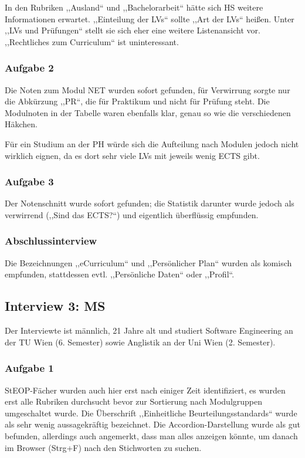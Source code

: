 \documentclass[a4paper,10pt]{scrartcl}
\begin{document}
In den Rubriken ,,Ausland`` und ,,Bachelorarbeit`` hätte sich HS weitere Informationen erwartet. ,,Einteilung der LVs`` sollte ,,Art der LVs`` heißen. Unter ,,LVs und Prüfungen`` stellt sie sich eher eine weitere Listenansicht vor. ,,Rechtliches zum Curriculum`` ist uninteressant.

\subsubsection*{Aufgabe 2}

Die Noten zum Modul NET wurden sofort gefunden, für Verwirrung sorgte nur die Abkürzung ,,PR``, die für Praktikum und nicht für Prüfung steht. Die Modulnoten in der Tabelle waren ebenfalls klar, genau so wie die verschiedenen Häkchen.

Für ein Studium an der PH würde sich die Aufteilung nach Modulen jedoch nicht wirklich eignen, da es dort sehr viele LVs mit jeweils wenig ECTS gibt.

\subsubsection*{Aufgabe 3}

Der Notenschnitt wurde sofort gefunden; die Statistik darunter wurde jedoch als verwirrend (,,Sind das ECTS?“) und eigentlich überflüssig empfunden.

\subsubsection*{Abschlussinterview}

Die Bezeichnungen ,,eCurriculum`` und ,,Persönlicher Plan`` wurden als komisch empfunden, stattdessen evtl. ,,Persönliche Daten`` oder ,,Profil``.

\subsection*{Interview 3: MS}

Der Interviewte ist männlich, 21 Jahre alt und studiert Software Engineering an der TU Wien (6. Semester) sowie Anglistik an der Uni Wien (2. Semester).

\subsubsection*{Aufgabe 1}

StEOP-Fächer wurden auch hier erst nach einiger Zeit identifiziert, es wurden erst alle Rubriken durchsucht bevor zur Sortierung nach Modulgruppen umgeschaltet wurde. Die Überschrift ,,Einheitliche Beurteilungsstandards`` wurde als sehr wenig aussagekräftig bezeichnet. Die Accordion-Darstellung wurde als gut befunden, allerdings auch angemerkt, dass man alles anzeigen könnte, um danach im Browser (Strg+F) nach den Stichworten zu suchen.
\end{document}
